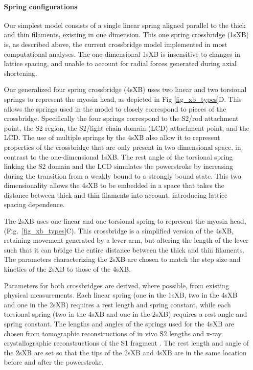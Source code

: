 \documentclass[]{article}
\begin{document}
\paragraph{Spring configurations} %
Our simplest model consists of a single linear spring aligned parallel to the thick and thin filaments, existing in one dimension.
This one spring crossbridge (1sXB) is, as described above, the current crossbridge model implemented in most computational analyses. 
The one-dimensional 1sXB is insensitive to changes in lattice spacing, and unable to account for radial forces generated during axial shortening.

Our generalized four spring crossbridge (4sXB) uses two linear and two torsional springs to represent the myosin head, as depicted in Fig \ref{fig_xb_types}D.
This allows the springs used in the model to closely correspond to pieces of the crossbridge.
Specifically the four springs correspond to the S2/rod attachment point, the S2 region, the S2/light chain domain (LCD) attachment point, and the LCD.
The use of multiple springs by the 4sXB also allow it to represent properties of the crossbridge that are only present in two dimensional space, in contrast to the one-dimensional 1sXB. 
The rest angle of the torsional spring linking the S2 domain and the LCD simulates the powerstroke by increasing during the transition from a weakly bound to a strongly bound state.
This two dimensionality allows the 4sXB to be embedded in a space that takes the distance between thick and thin filaments into account, introducing lattice spacing dependence.

The 2sXB uses one linear and one torsional spring to represent the myosin head, (Fig.~\ref{fig_xb_types}C).
This crossbridge is a simplified version of the 4sXB, retaining movement generated by a lever arm, but altering the length of the lever such that it can bridge the entire distance between the thick and thin filaments.
The parameters characterizing the 2sXB are chosen to match the step size and kinetics of the 2sXB to those of the 4sXB.

Parameters for both crossbridges are derived, where possible, from existing physical measurements.
Each linear spring (one in the 1sXB, two in the 4sXB and one in the 2sXB) requires a rest length and spring constant, while each torsional spring (two in the 4sXB and one in the 2sXB) requires a rest angle and spring constant.
The lengths and angles of the springs used for the 4sXB are chosen from tomographic reconstructions of in vivo S2 lengths and x-ray crystallographic reconstructions of the S1 fragment \citep{Taylor1999, Rayment1993}.
The rest length and angle of the 2sXB are set so that the tips of the 2sXB and 4sXB are in the same location before and after the powerstroke.
\end{document}

